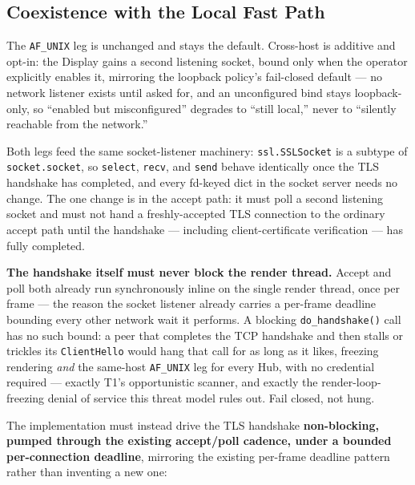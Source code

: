 \documentclass[a4paper,10pt]{article}
\newcommand{\field}[1]{\texttt{#1}}
\begin{document}
\subsection{Coexistence with the Local Fast Path}

The \field{AF\_UNIX} leg is unchanged and stays the default.  Cross-host is
additive and opt-in: the Display gains a second listening socket, bound
only when the operator explicitly enables it, mirroring the loopback
policy's fail-closed default --- no network listener exists until asked
for, and an unconfigured bind stays loopback-only, so ``enabled but
misconfigured'' degrades to ``still local,'' never to ``silently reachable
from the network.''

Both legs feed the same socket-listener machinery: \field{ssl.SSLSocket}
is a subtype of \field{socket.socket}, so \field{select}, \field{recv},
and \field{send} behave identically once the TLS handshake has completed,
and every fd-keyed dict in the socket server needs no change.  The one
change is in the accept path: it must poll a second listening socket and
must not hand a freshly-accepted TLS connection to the ordinary accept
path until the handshake --- including client-certificate verification ---
has fully completed.

\textbf{The handshake itself must never block the render thread.}  Accept
and poll both already run synchronously inline on the single render
thread, once per frame --- the reason the socket listener already carries
a per-frame deadline bounding every other network wait it performs.  A
blocking \field{do\_handshake()} call has no such bound: a peer that
completes the TCP handshake and then stalls or trickles its
\field{ClientHello} would hang that call for as long as it likes, freezing
rendering \emph{and} the same-host \field{AF\_UNIX} leg for every Hub,
with no credential required --- exactly T1's opportunistic scanner, and
exactly the render-loop-freezing denial of service this threat model rules
out.  Fail closed, not hung.

The implementation must instead drive the TLS handshake
\textbf{non-blocking, pumped through the existing accept/poll cadence,
under a bounded per-connection deadline}, mirroring the existing per-frame
deadline pattern rather than inventing a new one:
\end{document}
